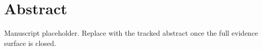 \section*{Abstract}

Manuscript placeholder. Replace with the tracked abstract once the full evidence surface is closed.
